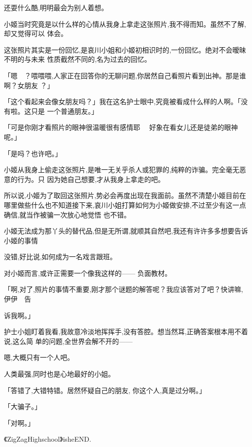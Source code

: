 \documentclass{article}
\begin{document}
还耍什么酷,明明最会为别人着想。 

\newpage

小姬当时究竟是以什么样的心情从我身上拿走这张照片,我不得而知。虽然不了解,却又觉得可以
体会。 

这张照片其实是一份回忆,是哀川小姐和小姬初相识时的,一份回忆。绝对不会暧昧不明的与未来
性质截然不同的,名为过去的回忆。 

「嗯~~？喂喂喂,人家正在回答你的无聊问题,你居然自己看照片看到出神。那是谁啊？女朋友
？」 

「这个看起来会像女朋友吗？」我在这名护士眼中,究竟被看成什么样的人啊。「没有啦。这只是
一个普通朋友。」 

「可是你刚才看照片的眼神很温暖很有感情耶
~~好象在看女儿还是徒弟的眼神呢。」 


「是吗？也许吧。」 

\newpage

小姬从我身上偷走这张照片,是唯一无关乎杀人或犯罪的,纯粹的诈骗。完全毫无恶意的行为。只
因为她自己想要,才从我身上拿走的吧。 

所以说,小姬为了取回这张照片,势必会再度出现在我面前。虽然不清楚小姬目前在哪里做些什么也不知道接下来,哀川小姐打算如何为小姬做安排,不过至少有这一点确信,就当作被骗一次放心地觉悟
也不错。 

小姬无法成为那丫头的替代品,但是无所谓,就顺其自然吧,我还有许许多多想要告诉小姬的事情


没错,好比说,如何成为一名戏言跟班。 

对小姬而言,或许正需要一个像我这样的——
负面教材。 

「啊,对了,照片的事情不重要,刚才那个谜题的解答呢？我应该答对了吧？快讲嘛,伊伊~~告

\newpage
诉我啊。」 

护士小姐盯着我看,我故意冷淡地挥挥手,没有答腔。想当然耳,正确答案根本用不着说,这么简
单的问题,全世界会解不开的—— 


嗯,大概只有一个人吧。 


人类最强,同时也是心地最好的小姐。 

「答错了,大错特错。居然怀疑自己的朋友,
你这个人,真是过分啊。」 


「大骗子。」 


「对啊。」 

《ZigZagHighschool》isheEND.
\end{document}
